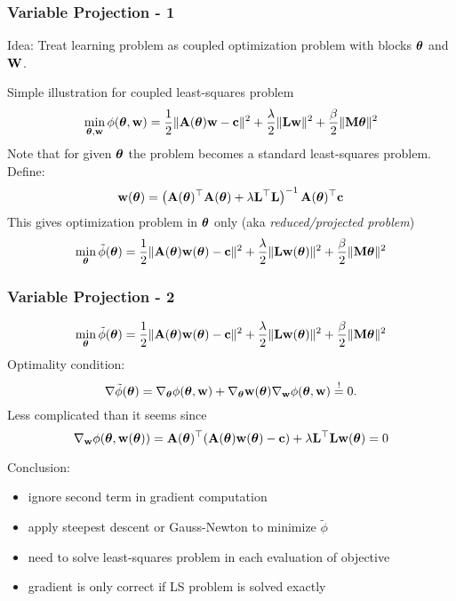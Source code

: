 \documentclass[12pt,fleqn]{beamer}
\begin{document}
\begin{frame}\frametitle{Variable Projection - 1}
	Idea: Treat learning problem as coupled optimization problem with blocks ${\boldsymbol \theta}$ and ${\bf W}$. 
	
	Simple illustration for coupled least-squares problem~\cite{GoPe1973,GoPe03,OLearyRust2013}
	$$
		\min_{{\boldsymbol \theta},{\bf w}} \phi({\boldsymbol \theta},{\bf w}) = {\frac 12} \| {\bf A}({\boldsymbol \theta}) {\bf w} - {\bf c}\|^2 + \frac{\lambda}{2}\| {\bf L} {\bf w}\|^2 + \frac{\beta}{2} \| {\bf M} {\boldsymbol \theta}\|^2
	$$
	Note that for given ${\boldsymbol \theta}$ the problem becomes a standard least-squares problem. Define: 
	$$
		{\bf w}({\boldsymbol \theta}) = \left( {\bf A}({\boldsymbol \theta})^\top {\bf A}({\boldsymbol \theta}) + \lambda {\bf L}^\top {\bf L} \right)^{-1}{{\bf A}({\boldsymbol \theta})^\top {\bf c}}
	$$
	This gives optimization problem in ${\boldsymbol \theta}$ only (aka \emph{reduced/projected  problem})
	$$
		\min_{{\boldsymbol \theta}} \tilde{\phi}({\boldsymbol \theta}) = {\frac 12} \| {\bf A}({\boldsymbol \theta}) {\bf w}({\boldsymbol \theta}) - {\bf c}\|^2 + \frac{\lambda}{2}\| {\bf L} {\bf w}({\boldsymbol \theta})\|^2 + \frac{\beta}{2} \| {\bf M} {\boldsymbol \theta}\|^2
	$$
	
\end{frame}
\begin{frame}\frametitle{Variable Projection - 2}
	$$
		\min_{{\boldsymbol \theta}} \tilde{\phi}({\boldsymbol \theta}) = {\frac 12} \| {\bf A}({\boldsymbol \theta}) {\bf w}({\boldsymbol \theta}) - {\bf c}\|^2 + \frac{\lambda}{2}\| {\bf L} {\bf w}({\boldsymbol \theta})\|^2 + \frac{\beta}{2} \| {\bf M} {\boldsymbol \theta}\|^2
	$$
	Optimality condition:
	$$ 
		\nabla \tilde{\phi}({\boldsymbol \theta}) = \nabla_{\boldsymbol \theta} \phi({\boldsymbol \theta},{\bf w}) + \nabla_{\boldsymbol \theta} {\bf w}({\boldsymbol \theta}) \nabla_{{\bf w}} \phi({\boldsymbol \theta},{\bf w}) \stackrel{!}{=} 0.
	$$
	Less complicated than it seems since
	$$
		\nabla_{{\bf w}} \phi({\boldsymbol \theta},{\bf w}({\boldsymbol \theta})) = {\bf A}({\boldsymbol \theta})^\top( {\bf A}({\boldsymbol \theta}) {\bf w}({\boldsymbol \theta}) - {\bf c}) + \lambda {\bf L}^\top {\bf L} {\bf w}({\boldsymbol \theta}) = 0
	$$
	
	Conclusion:
	\begin{itemize}
		\item ignore second term in gradient computation
		\item apply steepest descent or Gauss-Newton  to minimize $\tilde{\phi}$
		\item need to solve least-squares problem in each evaluation of objective
		\item gradient is only correct if LS problem is solved exactly
	\end{itemize}
	
\end{frame}
\end{document}
